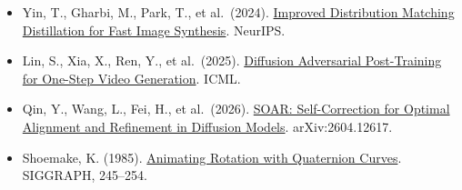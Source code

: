\begin{itemize}
\item
  Yin, T., Gharbi, M., Park, T., et al.~(2024). \href{https://arxiv.org/abs/2405.14867}{Improved Distribution Matching Distillation for Fast Image Synthesis}. NeurIPS.
\item
  Lin, S., Xia, X., Ren, Y., et al.~(2025). \href{https://arxiv.org/abs/2501.08316}{Diffusion Adversarial Post-Training for One-Step Video Generation}. ICML.
\item
  Qin, Y., Wang, L., Fei, H., et al.~(2026). \href{https://arxiv.org/abs/2604.12617}{SOAR: Self-Correction for Optimal Alignment and Refinement in Diffusion Models}. arXiv:2604.12617.
\item
  Shoemake, K. (1985). \href{https://doi.org/10.1145/325334.325242}{Animating Rotation with Quaternion Curves}. SIGGRAPH, 245--254.
\end{itemize}

\clearpage
